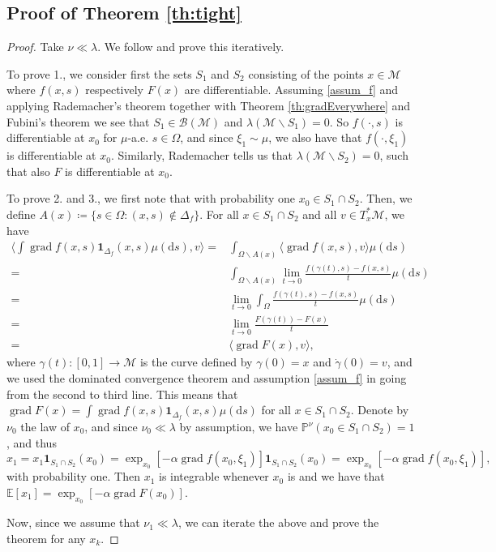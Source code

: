\documentclass{article}
\newcommand{\CM}{\mathcal{M}}
\newcommand{\rd}{\mathrm{d}}
\DeclareMathOperator{\grad}{grad}
\begin{document}
\subsection{Proof of Theorem \ref{th:tight}}
\begin{proof}Take $\nu\ll\lambda$. We follow \cite{bianchi2022convergence} and prove this iteratively. 

To prove 1., we consider first the sets $S_1$ and $S_2$ consisting of the points $x\in\CM$ where $f(x,s)$ respectively $F(x)$ are differentiable. Assuming \ref{assum_f} and applying Rademacher's theorem together with Theorem \ref{th:gradEverywhere} and Fubini's theorem we see that $S_1\in\mathcal{B}(\CM)$ and $\lambda(\CM\backslash S_1)=0$. So $f(\cdot,s)$ is differentiable at $x_0$ for $\mu$-a.e. $s\in\Omega$, and since $\xi_{1}\sim \mu$, we also have that $f(\cdot,\xi_1)$ is differentiable at $x_0$. Similarly, Rademacher tells us that $\lambda(\CM\backslash S_2)=0$, such that also $F$ is differentiable at $x_0$.  

To prove 2. and 3., we first note that with probability one $x_0\in S_1\cap S_2$. Then, we define $A(x)\coloneqq \{s\in\Omega:(x,s)\notin \Delta_f\}$. For all $x\in S_1\cap S_2$ and all $v\in T^*_x\CM$, we have
\begin{equation}
    \begin{aligned}
        \langle\int \grad f(x,s)\mathbf{1}_{\Delta_f}(x,s)\mu(\rd s),v\rangle=&\int_{\Omega\backslash A(x)}\langle\grad f(x,s),v\rangle\mu(\rd s)\\
        =&\int_{\Omega\backslash A(x)}\lim_{t\to 0}\frac{f(\gamma(t),s)-f(x,s)}{t}\mu(\rd s)\\
        =&\lim_{t\to 0}\int_{\Omega}\frac{f(\gamma(t),s)-f(x,s)}{t}\mu(\rd s)\\
        =&\lim_{t\to 0}\frac{F(\gamma(t))-F(x)}{t}\\
        =&\langle \grad F(x),v\rangle,
    \end{aligned}
\end{equation}
where $\gamma(t):[0,1]\to\CM$ is the curve defined by $\gamma(0)=x$ and $\dot\gamma(0)=v$, and we used the dominated convergence theorem and assumption \ref{assum_f} in going from the second to third line. This means that $\grad F(x)=\int \grad f(x,s)\mathbf{1}_{\Delta_f}(x,s)\mu(\rd s)$ for all $x\in S_1\cap S_2$. Denote by $\nu_0$ the law of $x_0$, and since $\nu_0\ll\lambda$ by assumption, we have $\mathbb{P}^\nu(x_0\in S_1\cap S_2)=1$, and thus
\begin{equation}
    x_1=x_1\mathbf{1}_{S_1\cap S_2}(x_0)=\exp_{x_0}[-\alpha\grad f(x_0,\xi_1)]\mathbf{1}_{S_1\cap S_2}(x_0)=\exp_{x_0}[-\alpha\grad f(x_0,\xi_1)],
\end{equation}
with probability one. Then $x_1$ is integrable whenever $x_0$ is and we have that $\mathbb{E}[x_1]=\exp_{x_0}[-\alpha\grad F(x_0)]$. 

Now, since we assume that $\nu_1\ll\lambda$, we can iterate the above and prove the theorem for any $x_k$. \end{proof}
\end{document}
